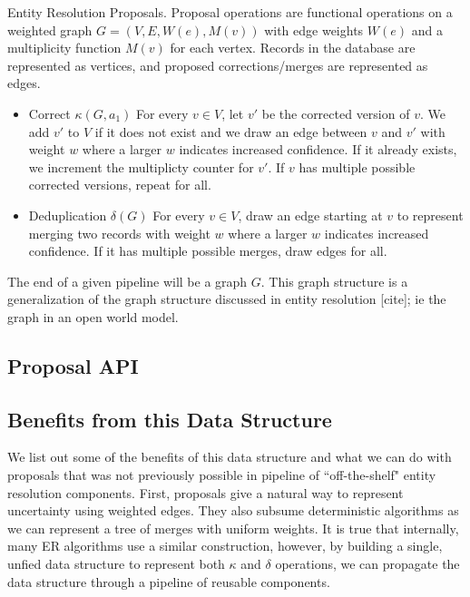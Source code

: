 \begin{definition} Entity Resolution Proposals. 
Proposal operations are functional operations on a weighted graph $G=(V,E,W(e),M(v))$ with edge weights $W(e)$ and a multiplicity function $M(v)$ for each vertex. 
Records in the database are represented as vertices, and proposed corrections/merges are represented as edges.
\begin{itemize}
\item Correct $\kappa(G,a_{1})$ For every $v \in V$, let $v'$ be the corrected version of $v$. We add $v'$ to $V$ if it does not exist and we draw an edge between $v$ and $v'$ with weight $w$ where a larger $w$ indicates increased confidence. If it already exists, we increment the multiplicty counter for $v'$. If $v$ has multiple possible corrected versions, repeat for all.
\item Deduplication $\delta(G)$ For every $v \in V$, draw an edge starting at $v$ to represent merging two records with weight $w$ where a larger $w$ indicates increased confidence. If it has multiple possible merges, draw edges for all.
\end{itemize}
\end{definition}

The end of a given pipeline will be a graph $G$. 
This graph structure is a generalization of the graph structure discussed in entity resolution [cite]; ie the graph in an open world model.

\subsection{Proposal API}

\subsection{Benefits from this Data Structure}
We list out some of the benefits of this data structure and what we can do with proposals that was not previously possible in pipeline of ``off-the-shelf" entity resolution components. First, proposals give a natural way to represent uncertainty using weighted edges. They also subsume deterministic algorithms as we can represent a tree of merges with uniform weights. It is true that internally, many ER algorithms use a similar construction, however, by building a single, unfied data structure to represent both $\kappa$ and $\delta$ operations, we can propagate the data structure through a pipeline of reusable components. 


